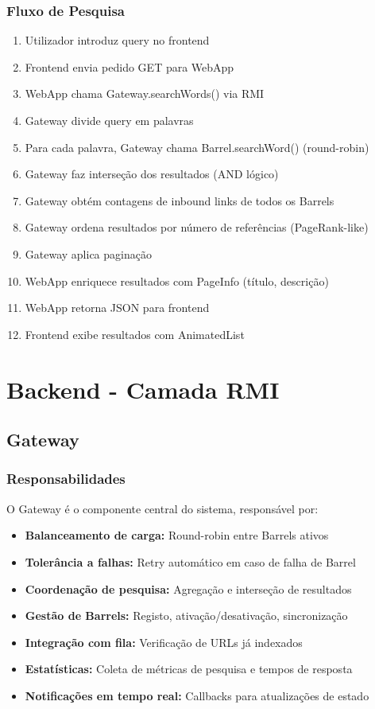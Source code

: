 \documentclass[12pt,a4paper]{article}
\begin{document}
\subsubsection{Fluxo de Pesquisa}
\begin{enumerate}
    \item Utilizador introduz query no frontend
    \item Frontend envia pedido GET para WebApp
    \item WebApp chama Gateway.searchWords() via RMI
    \item Gateway divide query em palavras
    \item Para cada palavra, Gateway chama Barrel.searchWord() (round-robin)
    \item Gateway faz interseção dos resultados (AND lógico)
    \item Gateway obtém contagens de inbound links de todos os Barrels
    \item Gateway ordena resultados por número de referências (PageRank-like)
    \item Gateway aplica paginação
    \item WebApp enriquece resultados com PageInfo (título, descrição)
    \item WebApp retorna JSON para frontend
    \item Frontend exibe resultados com AnimatedList
\end{enumerate}

\newpage

\section{Backend - Camada RMI}

\subsection{Gateway}

\subsubsection{Responsabilidades}
O Gateway é o componente central do sistema, responsável por:
\begin{itemize}
    \item \textbf{Balanceamento de carga:} Round-robin entre Barrels ativos
    \item \textbf{Tolerância a falhas:} Retry automático em caso de falha de Barrel
    \item \textbf{Coordenação de pesquisa:} Agregação e interseção de resultados
    \item \textbf{Gestão de Barrels:} Registo, ativação/desativação, sincronização
    \item \textbf{Integração com fila:} Verificação de URLs já indexados
    \item \textbf{Estatísticas:} Coleta de métricas de pesquisa e tempos de resposta
    \item \textbf{Notificações em tempo real:} Callbacks para atualizações de estado
\end{itemize}
\end{document}
